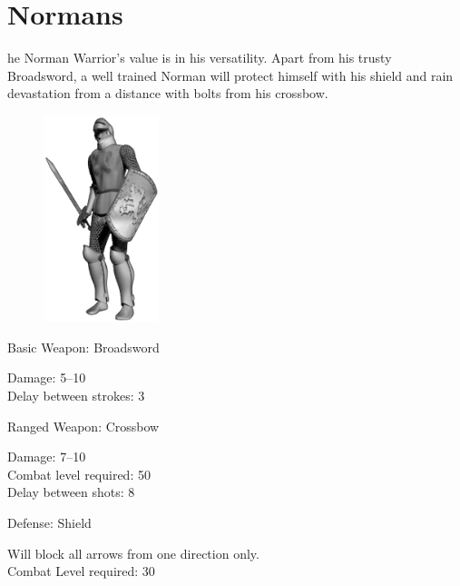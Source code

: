 \clearpage

\section{Normans}


he Norman Warrior’s value is in his versatility. Apart from his trusty Broadsword, a well trained Norman will protect himself with his shield and rain devastation from a distance with bolts from his crossbow.

\begin{figure}
	\begin{center}
		\vspace{-20pt}
		\includegraphics[width=0.3\textwidth]{Anorman}
	\end{center}
	\vspace{-20pt}
\end{figure}

Basic Weapon: Broadsword
\begin{changemargin}{.5cm}{0cm}
	Damage: 5–10 \\
	Delay between strokes: 3
\end{changemargin}
Ranged Weapon: Crossbow
\begin{changemargin}{.5cm}{0cm}
	Damage: 7–10 \\
	Combat level required: 50 \\
	Delay between shots: 8
\end{changemargin}
Defense: Shield
\begin{changemargin}{.5cm}{0cm}
	Will block all arrows from one direction only. \\
	Combat Level required: 30 \\ \\
\end{changemargin}


